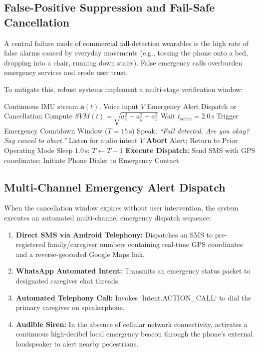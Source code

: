 \documentclass[10pt,twocolumn]{article}
\begin{document}
\subsection{False-Positive Suppression and Fail-Safe Cancellation}
A central failure mode of commercial fall-detection wearables is the high rate of false alarms caused by everyday movements (e.g., tossing the phone onto a bed, dropping into a chair, running down stairs). False emergency calls overburden emergency services and erode user trust.

To mitigate this, robust systems implement a multi-stage verification window:
\begin{algorithm}[H]
\caption{Fail-Safe Fall Detection and Dispatch Flow}
\label{alg:fall}
\begin{algorithmic}[1]
\Require Continuous IMU stream $\mathbf{a}(t)$, Voice input $V$
\Ensure Emergency Alert Dispatch or Cancellation
\State Compute $SVM(t) = \sqrt{a_x^2 + a_y^2 + a_z^2}$
    \State Wait $t_{\text{settle}} = 2.0\,\text{s}$
        \State Trigger Emergency Countdown Window ($T = 15\,\text{s}$)
        \State Speak: \textit{``Fall detected. Are you okay? Say cancel to abort.''}
            \State Listen for audio intent $V$
                \State \textbf{Abort} Alert; Return to Prior Operating Mode
            \EndIf
            \State Sleep $1.0\,\text{s}$; $T \gets T - 1$
        \EndWhile
        \State \textbf{Execute Dispatch: } Send SMS with GPS coordinates; Initiate Phone Dialer to Emergency Contact
    \EndIf
\EndIf
\end{algorithmic}
\end{algorithm}

\subsection{Multi-Channel Emergency Alert Dispatch}
When the cancellation window expires without user intervention, the system executes an automated multi-channel emergency dispatch sequence:
\begin{enumerate}[leftmargin=*]
    \item \textbf{Direct SMS via Android Telephony:} Dispatches an SMS to pre-registered family/caregiver numbers containing real-time GPS coordinates and a reverse-geocoded Google Maps link.
    \item \textbf{WhatsApp Automated Intent:} Transmits an emergency status packet to designated caregiver chat threads.
    \item \textbf{Automated Telephony Call:} Invokes `Intent.ACTION\_CALL` to dial the primary caregiver on speakerphone.
    \item \textbf{Audible Siren:} In the absence of cellular network connectivity, activates a continuous high-decibel local emergency beacon through the phone's external loudspeaker to alert nearby pedestrians.
\end{enumerate}
\end{document}
